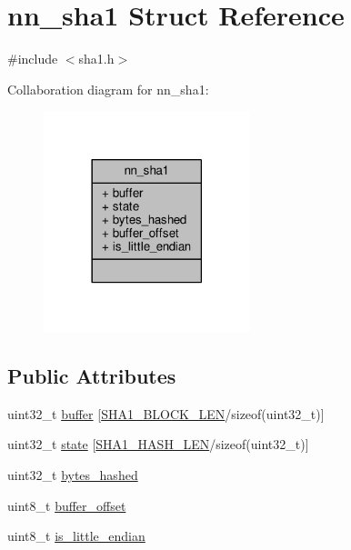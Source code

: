 \hypertarget{structnn__sha1}{}\section{nn\+\_\+sha1 Struct Reference}
\label{structnn__sha1}


{\ttfamily \#include $<$sha1.\+h$>$}



Collaboration diagram for nn\+\_\+sha1\+:\nopagebreak
\begin{figure}[H]
\begin{center}
\leavevmode
\includegraphics[width=170pt]{structnn__sha1__coll__graph}
\end{center}
\end{figure}
\subsection*{Public Attributes}
\begin{DoxyCompactItemize}
\item 
uint32\+\_\+t \hyperlink{structnn__sha1_a7535f28482cd3610ecc5b0d0b72fd276}{buffer} \mbox{[}\hyperlink{sha1_8h_ab29ebd3b274e21e96fb89f5993e0ed4b}{S\+H\+A1\+\_\+\+B\+L\+O\+C\+K\+\_\+\+L\+EN}/sizeof(uint32\+\_\+t)\mbox{]}
\item 
uint32\+\_\+t \hyperlink{structnn__sha1_ad3a14228d8f947c5d6a1617f7e4314a5}{state} \mbox{[}\hyperlink{sha1_8h_abc253430c98bab25e98aa93483fd6ce7}{S\+H\+A1\+\_\+\+H\+A\+S\+H\+\_\+\+L\+EN}/sizeof(uint32\+\_\+t)\mbox{]}
\item 
uint32\+\_\+t \hyperlink{structnn__sha1_a2a408e88ffe4f2331227950f66e61018}{bytes\+\_\+hashed}
\item 
uint8\+\_\+t \hyperlink{structnn__sha1_a5eda1144a7fdd41d01c70d38cdf76bfd}{buffer\+\_\+offset}
\item 
uint8\+\_\+t \hyperlink{structnn__sha1_ae62f56096d4ed975f2c463994331091b}{is\+\_\+little\+\_\+endian}
\end{DoxyCompactItemize}



